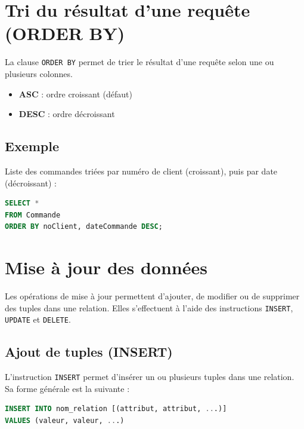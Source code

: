 \section{Tri du résultat d’une requête (ORDER BY)}

La clause \texttt{ORDER BY} permet de trier le résultat d'une requête selon une ou plusieurs colonnes.

\begin{itemize}
    \item \textbf{ASC} : ordre croissant (défaut)
    \item \textbf{DESC} : ordre décroissant
\end{itemize}

\subsection*{Exemple}

Liste des commandes triées par numéro de client (croissant), puis par date (décroissant) :

\begin{sqlcodebox}
\begin{lstlisting}[language=SQL]
SELECT *
FROM Commande
ORDER BY noClient, dateCommande DESC;
\end{lstlisting}
\end{sqlcodebox}

\section{Mise à jour des données}

Les opérations de mise à jour permettent d’ajouter, de modifier ou de supprimer
des tuples dans une relation. Elles s'effectuent à l’aide des instructions
\texttt{INSERT}, \texttt{UPDATE} et \texttt{DELETE}.

\subsection{Ajout de tuples (INSERT)}

L’instruction \texttt{INSERT} permet d’insérer un ou plusieurs tuples dans une relation.
Sa forme générale est la suivante :

\begin{sqlcodebox}
\begin{lstlisting}[language=SQL]
INSERT INTO nom_relation [(attribut, attribut, ...)]
VALUES (valeur, valeur, ...)
\end{lstlisting}
\end{sqlcodebox}

